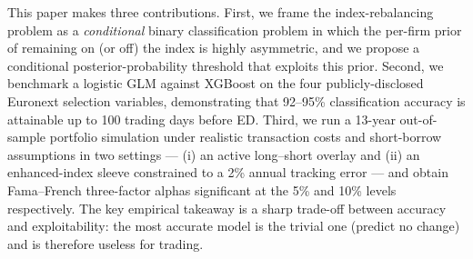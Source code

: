 This paper makes three contributions. First, we frame the index-rebalancing problem as a \emph{conditional} binary classification problem in which the per-firm prior of remaining on (or off) the index is highly asymmetric, and we propose a conditional posterior-probability threshold that exploits this prior. Second, we benchmark a logistic GLM against XGBoost on the four publicly-disclosed Euronext selection variables, demonstrating that 92--95\% classification accuracy is attainable up to 100 trading days before ED. Third, we run a 13-year out-of-sample portfolio simulation under realistic transaction costs and short-borrow assumptions in two settings --- (i) an active long--short overlay and (ii) an enhanced-index sleeve constrained to a 2\% annual tracking error \parencite{ssg-tracking-error-enhanced} --- and obtain Fama--French three-factor alphas significant at the 5\% and 10\% levels respectively. The key empirical takeaway is a sharp trade-off between accuracy and exploitability: the most accurate model is the trivial one (predict no change) and is therefore useless for trading.
